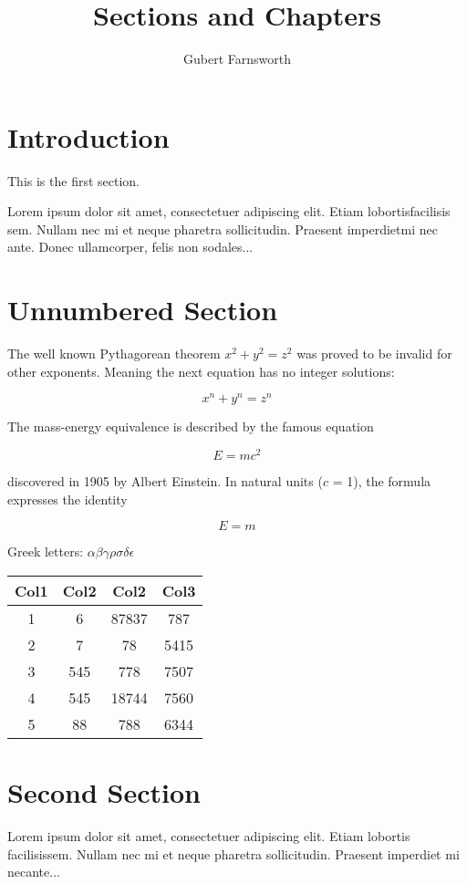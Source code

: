 \documentclass{article}
\title{Sections and Chapters}
\author{Gubert Farnsworth}
\date{ }
\begin{document}
  
\maketitle
  
\tableofcontents

\section{Introduction}
   
This is the first section.
      
Lorem  ipsum  dolor  sit  amet,  consectetuer  adipiscing  
elit.   Etiam  lobortisfacilisis sem.  Nullam nec mi et 
neque pharetra sollicitudin.  Praesent imperdietmi nec ante. 
Donec ullamcorper, felis non sodales...
       
\section*{Unnumbered Section}

The well known Pythagorean theorem \(x^2 + y^2 = z^2\) was 
proved to be invalid for other exponents. 
Meaning the next equation has no integer solutions:

\[ x^n + y^n = z^n \]

The mass-energy equivalence is described by the famous equation

\[E=mc^2\]

discovered in 1905 by Albert Einstein. 
In natural units ($c$ = 1), the formula expresses the identity

\begin{equation}
E=m
\end{equation}

Greek letters: \(\alpha \beta \gamma \rho \sigma \delta \epsilon \)

\begin{center}
\begin{tabular}{||c c c c||} 
\hline
Col1 & Col2 & Col2 & Col3 \\ [0.5ex] 
\hline\hline
1 & 6 & 87837 & 787 \\ 
\hline
2 & 7 & 78 & 5415 \\
\hline
3 & 545 & 778 & 7507 \\
\hline
4 & 545 & 18744 & 7560 \\
\hline
5 & 88 & 788 & 6344 \\ [1ex] 
\hline
\end{tabular}
\end{center}

\section{Second Section}
       
Lorem ipsum dolor sit amet, consectetuer adipiscing elit.  
Etiam lobortis facilisissem.  Nullam nec mi et neque pharetra 
sollicitudin.  Praesent imperdiet mi necante...
         
\end{document}

